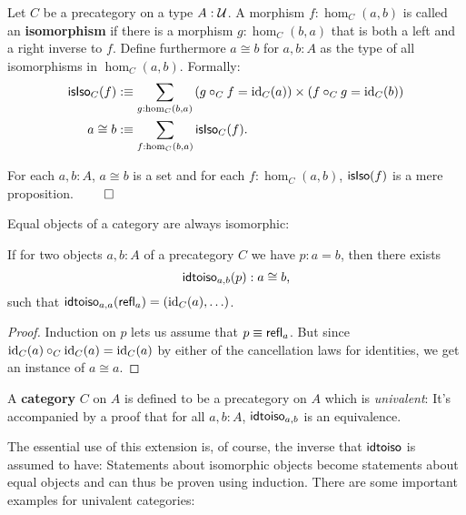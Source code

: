 \begin{defn}[Isomorphisms]
Let $C$ be a precategory on a type $A : \mathcal{U}$. A morphism $f : \hom_C(a, b)$ is
called an \textbf{isomorphism} if there is a morphism $g : \hom_C(b,a)$ that
is both a left and a right inverse to $f$.
Define furthermore $a \cong b$ for $a, b : A$ as the type of all isomorphisms in
$\hom_C(a, b)$.
Formally:
\begin{align*}
\mathsf{isIso}_C(f) &:\equiv \sum_{g:\hom_C(b,a)}
	\left(g \circ_C f = \operatorname{id}_C(a)\right) \times \left(f \circ_C g = \operatorname{id}_C(b)\right) \\
a \cong b &:\equiv \sum_{f:\hom_C(b,a)} \mathsf{isIso}_C(f) \text{.}
\end{align*}
\end{defn}

\begin{lemma}
For each $a, b : A$, $a \cong b$ is a set and for each $f : \hom_C(a, b)$,
$\mathsf{isIso}(f)$ is a mere proposition. \hfill $\qed$
\end{lemma}

Equal objects of a category are always isomorphic: %

\begin{lemma}
If for two objects $a, b : A$ of a precategory $C$ we have $p : a = b$, then there
exists
\begin{equation*}
\mathsf{idtoiso}_{a,b}(p) : a \cong b \text{,}
\end{equation*}
such that $\mathsf{idtoiso}_{a,a}(\mathsf{refl}_a) = \left(\operatorname{id}_C(a),\ldots\right)$. %
\end{lemma}

\begin{proof}
Induction on $p$ lets us assume that $p \equiv \mathsf{refl}_a$. But since
$\operatorname{id}_C(a) \circ_C \operatorname{id}_C(a) = \operatorname{id}_C(a)$ by either of the cancellation laws for
identities, we get an instance of $a \cong a$.
\end{proof}

\begin{defn}[Category]
A \textbf{category} $C$ on $A$ is defined to be a precategory on $A$ which is
\emph{univalent}: It's accompanied
by a proof that for all $a, b : A$, $\mathsf{idtoiso}_{a,b}$ is an equivalence.
\end{defn}

The essential use of this extension is, of course, the inverse that $\mathsf{idtoiso}$
is assumed to have: Statements about isomorphic objects become statements about
equal objects and can thus be proven using induction. There are some important
examples for univalent categories:

